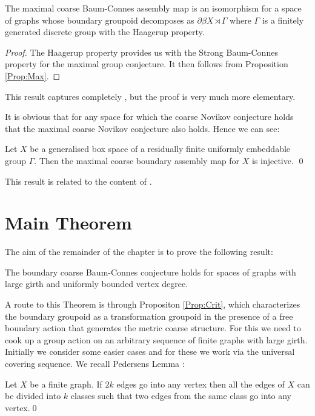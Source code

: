 \begin{theorem}
The maximal coarse Baum-Connes assembly map is an isomorphism for a space of graphs whose boundary groupoid decomposes as $\partial\beta X \rtimes \Gamma$ where $\Gamma$ is a finitely generated discrete group with the Haagerup property.
\end{theorem}
\begin{proof}
The Haagerup property provides us with the Strong Baum-Connes property for the maximal group conjecture. It then follows from Proposition \ref{Prop:Max}.
\end{proof}

This result captures completely \cite[Corollary 4.18]{MR2568691}, but the proof is very much more elementary.

It is obvious that for any space for which the coarse Novikov conjecture holds that the maximal coarse Novikov conjecture also holds. Hence we can see:

\begin{theorem}
Let $X$ be a generalised box space of a residually finite uniformly embeddable group $\Gamma$. Then the maximal coarse boundary assembly map for $X$ is injective. \qed
\end{theorem}

This result is related to the content of \cite[Theorem 5.1]{MR2431253} .

\section{Main Theorem}\label{Sect:MR}
The aim of the remainder of the chapter is to prove the following result:
\begin{theorem}
The boundary coarse Baum-Connes conjecture holds for spaces of graphs with large girth and uniformly bounded vertex degree.
\end{theorem}

A route to this Theorem is through Propositon \ref{Prop:Crit}, which characterizes the boundary groupoid as a transformation groupoid in the presence of a free boundary action that generates the metric coarse structure. For this we need to cook up a group action on an arbitrary sequence of finite graphs with large girth. Initially we consider some easier cases and for these we work via the universal covering sequence. We recall Pedersens Lemma \cite[Theorem 7, Chapter XI]{MR1035708}:

\begin{lemma}\label{Lem:PL}
Let $X$ be a finite graph. If $2k$ edges go into any vertex then all the edges of $X$ can be divided into $k$ classes such that two edges from the same class go into any vertex.\qed
\end{lemma}

